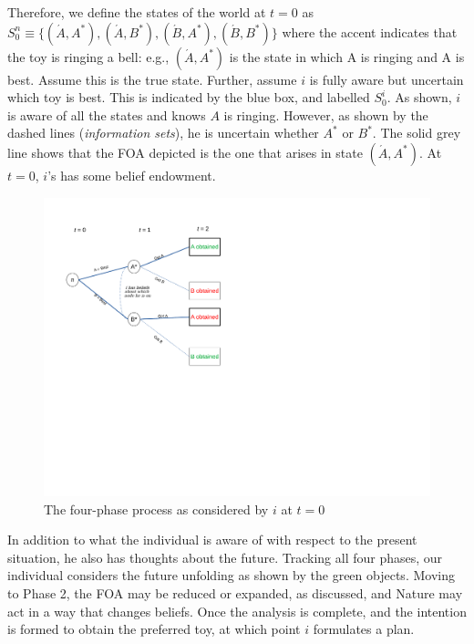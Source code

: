 \documentclass[
11pt,
titlepage,
reqno,
]{article}%
\theoremstyle{definition}
\begin{document}
Therefore, we define the states of the world at $t=0$ as $S^n_0\equiv \{(\acute{A},A^\ast),(\acute{A},B^\ast),(\acute{B},A^\ast),(\acute{B},B^\ast)\}$ where the accent indicates that the toy is ringing a bell: e.g., $(\acute{A},A^\ast)$ is the state in which A is ringing and A is best. Assume this is the true state. Further, assume $i$ is fully aware but uncertain which toy is best. This is indicated by the blue box, and labelled $S^i_0$. As shown, $i$ is aware of all the states and knows $A$ is ringing. However, as shown by the dashed lines (\textit{information sets}), he is uncertain whether $A^\ast$ or $B^\ast$. The solid grey line shows that the FOA depicted is the one that arises in state $(\acute{A},A^\ast)$. At $t=0$, $i$'s has some belief endowment. 

\begin{figure}[h!]
	\centering
	\includegraphics*[page=4,trim = 0 0in 0in 0in,scale=.65]{Awareness_Diagrams_All}
	\caption{The four-phase process as considered by $i$ at $t=0$\label{Diag: p-04}}%
\end{figure}

In addition to what the individual is aware of with respect to the present situation, he also has thoughts about the future. Tracking all four phases, our individual considers the future unfolding as shown by the green objects. Moving to Phase 2, the FOA may be reduced or expanded, as discussed, and Nature may act in a way that changes beliefs. Once the analysis is complete, and the intention is formed to obtain the preferred toy, at which point $i$ formulates a plan. 
\end{document}

